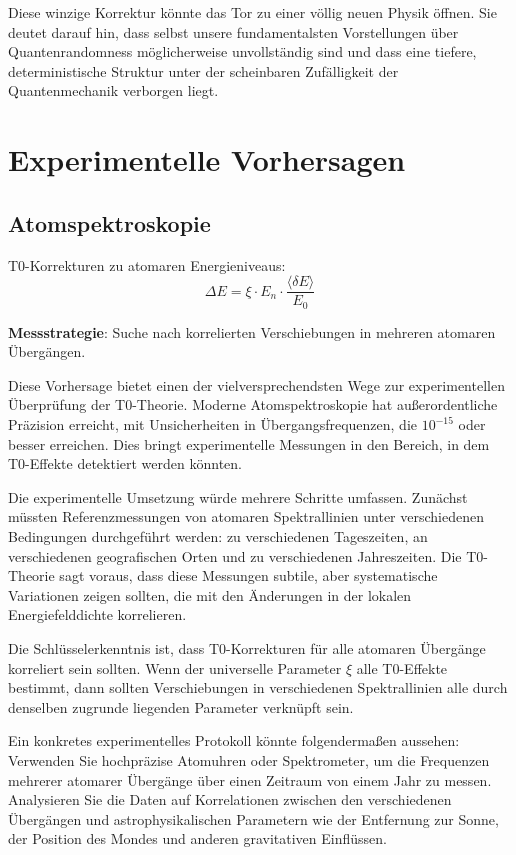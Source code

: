 \documentclass[12pt,a4paper]{article}
\newcommand{\deltaE}{\delta E}
\newcommand{\xipar}{\xi}
\theoremstyle{definition}
\theoremstyle{remark}
\begin{document}
Diese winzige Korrektur könnte das Tor zu einer völlig neuen Physik öffnen. Sie deutet darauf hin, dass selbst unsere fundamentalsten Vorstellungen über Quantenrandomness möglicherweise unvollständig sind und dass eine tiefere, deterministische Struktur unter der scheinbaren Zufälligkeit der Quantenmechanik verborgen liegt.

\section{Experimentelle Vorhersagen}

\subsection{Atomspektroskopie}

T0-Korrekturen zu atomaren Energieniveaus:
\begin{equation}
	\Delta E = \xipar \cdot E_n \cdot \frac{\langle \deltaE \rangle}{E_0}
	\label{eq:spectroscopic_shift}
\end{equation}

\textbf{Messstrategie}: Suche nach korrelierten Verschiebungen in mehreren atomaren Übergängen.

Diese Vorhersage bietet einen der vielversprechendsten Wege zur experimentellen Überprüfung der T0-Theorie. Moderne Atomspektroskopie hat außerordentliche Präzision erreicht, mit Unsicherheiten in Übergangsfrequenzen, die $10^{-15}$ oder besser erreichen. Dies bringt experimentelle Messungen in den Bereich, in dem T0-Effekte detektiert werden könnten.

Die experimentelle Umsetzung würde mehrere Schritte umfassen. Zunächst müssten Referenzmessungen von atomaren Spektrallinien unter verschiedenen Bedingungen durchgeführt werden: zu verschiedenen Tageszeiten, an verschiedenen geografischen Orten und zu verschiedenen Jahreszeiten. Die T0-Theorie sagt voraus, dass diese Messungen subtile, aber systematische Variationen zeigen sollten, die mit den Änderungen in der lokalen Energiefelddichte korrelieren.

Die Schlüsselerkenntnis ist, dass T0-Korrekturen für alle atomaren Übergänge korreliert sein sollten. Wenn der universelle Parameter $\xipar$ alle T0-Effekte bestimmt, dann sollten Verschiebungen in verschiedenen Spektrallinien alle durch denselben zugrunde liegenden Parameter verknüpft sein.

Ein konkretes experimentelles Protokoll könnte folgendermaßen aussehen: Verwenden Sie hochpräzise Atomuhren oder Spektrometer, um die Frequenzen mehrerer atomarer Übergänge über einen Zeitraum von einem Jahr zu messen. Analysieren Sie die Daten auf Korrelationen zwischen den verschiedenen Übergängen und astrophysikalischen Parametern wie der Entfernung zur Sonne, der Position des Mondes und anderen gravitativen Einflüssen.
\end{document}
